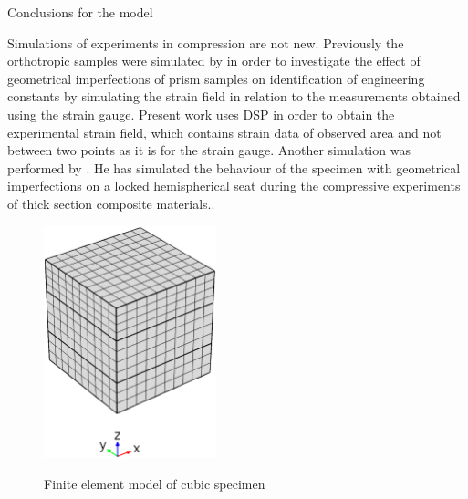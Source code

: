 \documentclass[review]{elsarticle}
\begin{document}
\begin{description}
\item[{\color {red}Conclusions for the model}]
\end{description}

Simulations of experiments in compression are not new. Previously the
orthotropic samples were simulated by \cite{Toftegaard1999849} in order to investigate the effect of
geometrical imperfections of prism samples on identification of engineering
constants by simulating the strain field in relation to the measurements
obtained using the strain gauge. 
Present work uses DSP in order to obtain the experimental strain field, which
contains strain data of observed area and not between two points as it is for the strain gauge. 
Another simulation was performed by \cite{Chen001}.
He has simulated the behaviour of the specimen with geometrical
imperfections on a locked hemispherical seat during the compressive experiments
of thick section composite materials..





\begin{figure}[h]
\centering
\includegraphics[width=5cm]{CubeFEM.eps}
\label{fig:cubemesh}
\caption{\label{fig:cubemesh} Finite element model of cubic specimen}
\end{figure}
\end{document}
